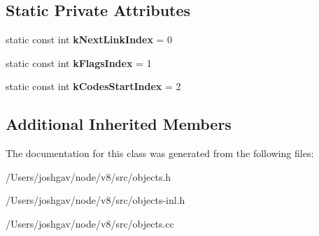 \subsection*{Static Private Attributes}
\begin{DoxyCompactItemize}
\item 
static const int {\bfseries k\+Next\+Link\+Index} = 0\hypertarget{classv8_1_1internal_1_1_dependent_code_a057f4432ccb628da219f030e4a86a891}{}\label{classv8_1_1internal_1_1_dependent_code_a057f4432ccb628da219f030e4a86a891}

\item 
static const int {\bfseries k\+Flags\+Index} = 1\hypertarget{classv8_1_1internal_1_1_dependent_code_a6e1649a8f0dd70ac4fe125854242157f}{}\label{classv8_1_1internal_1_1_dependent_code_a6e1649a8f0dd70ac4fe125854242157f}

\item 
static const int {\bfseries k\+Codes\+Start\+Index} = 2\hypertarget{classv8_1_1internal_1_1_dependent_code_a8a99eb7b00b2626e5bea175660981998}{}\label{classv8_1_1internal_1_1_dependent_code_a8a99eb7b00b2626e5bea175660981998}

\end{DoxyCompactItemize}
\subsection*{Additional Inherited Members}


The documentation for this class was generated from the following files\+:\begin{DoxyCompactItemize}
\item 
/\+Users/joshgav/node/v8/src/objects.\+h\item 
/\+Users/joshgav/node/v8/src/objects-\/inl.\+h\item 
/\+Users/joshgav/node/v8/src/objects.\+cc\end{DoxyCompactItemize}
